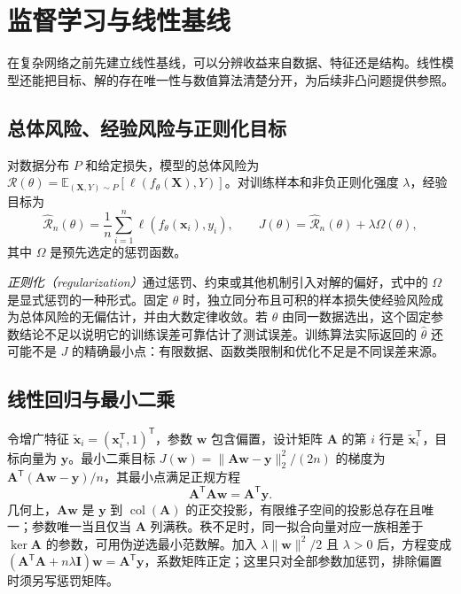 \setcounter{chapter}{3} %
\chapter{监督学习与线性基线}
\label{chap:dl-baselines}
在复杂网络之前先建立线性基线，可以分辨收益来自数据、特征还是结构。线性模型还能把目标、解的存在唯一性与数值算法清楚分开，为后续非凸问题提供参照。

\section{总体风险、经验风险与正则化目标}
\begin{definition}[风险与经验风险]
对数据分布 $P$ 和给定损失，模型的总体风险为 $\mathcal R(\theta)=\mathbb E_{(\mathbf X,Y)\sim P}[\ell(f_\theta(\mathbf X),Y)]$。对训练样本和非负正则化强度 $\lambda$，经验目标为
\begin{equation}
\widehat{\mathcal R}_n(\theta)=\frac1n\sum_{i=1}^n\ell(f_\theta(\mathbf x_i),y_i),
\qquad J(\theta)=\widehat{\mathcal R}_n(\theta)+\lambda\Omega(\theta),
\label{eq:dl-empirical-objective}
\end{equation}
其中 $\Omega$ 是预先选定的惩罚函数。
\end{definition}
\emph{正则化（regularization）}通过惩罚、约束或其他机制引入对解的偏好，式中的 $\Omega$ 是显式惩罚的一种形式。固定 $\theta$ 时，独立同分布且可积的样本损失使经验风险成为总体风险的无偏估计，并由大数定律收敛。若 $\theta$ 由同一数据选出，这个固定参数结论不足以说明它的训练误差可靠估计了测试误差。训练算法实际返回的 $\widehat\theta$ 还可能不是 $J$ 的精确最小点：有限数据、函数类限制和优化不足是不同误差来源。

\section{线性回归与最小二乘}
令增广特征 $\widetilde{\mathbf x}_i=(\mathbf x_i^\mathsf T,1)^\mathsf T$，参数 $\mathbf w$ 包含偏置，设计矩阵 $\mathbf A$ 的第 $i$ 行是 $\widetilde{\mathbf x}_i^\mathsf T$，目标向量为 $\mathbf y$。最小二乘目标 $J(\mathbf w)=\|\mathbf A\mathbf w-\mathbf y\|_2^2/(2n)$ 的梯度为 $\mathbf A^\mathsf T(\mathbf A\mathbf w-\mathbf y)/n$，其最小点满足正规方程
\begin{equation}
\mathbf A^\mathsf T\mathbf A\mathbf w=\mathbf A^\mathsf T\mathbf y.
\label{eq:dl-normal-equations}
\end{equation}
几何上，$\mathbf A\mathbf w$ 是 $\mathbf y$ 到 $\operatorname{col}(\mathbf A)$ 的正交投影，有限维子空间的投影总存在且唯一；参数唯一当且仅当 $\mathbf A$ 列满秩。秩不足时，同一拟合向量对应一族相差于 $\ker\mathbf A$ 的参数，可用伪逆选最小范数解。加入 $\lambda\|\mathbf w\|^2/2$ 且 $\lambda>0$ 后，方程变成 $(\mathbf A^\mathsf T\mathbf A+n\lambda\mathbf I)\mathbf w=\mathbf A^\mathsf T\mathbf y$，系数矩阵正定；这里只对全部参数加惩罚，排除偏置时须另写惩罚矩阵。

